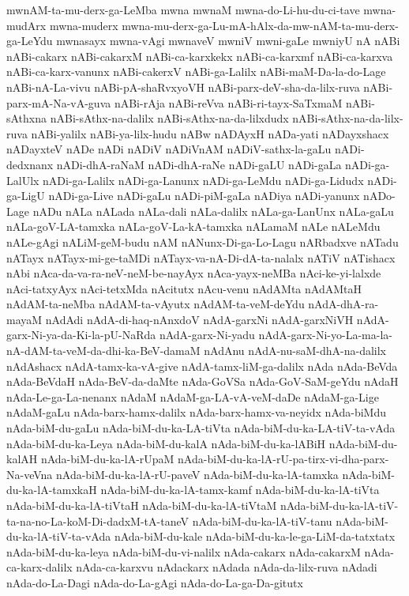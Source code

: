 {mwnAM-ta-mu-derx-ga-LeMba
mwna
mwnaM
mwna-do-Li-hu-du-ci-tave
mwna-mudArx
mwna-muderx
mwna-mu-derx-ga-Lu-mA-hAlx-da-mw-nAM-ta-mu-derx-ga-LeYdu
mwnasayx
mwna-vAgi
mwnaveV
mwniV
mwni-gaLe
mwniyU
nA
nABi
nABi-cakarx
nABi-cakarxM
nABi-ca-karxkekx
nABi-ca-karxmf
nABi-ca-karxva
nABi-ca-karx-vanunx
nABi-cakerxV
nABi-ga-Lalilx
nABi-maM-Da-la-do-Lage
nABi-nA-La-vivu
nABi-pA-shaRvxyoVH
nABi-parx-deV-sha-da-lilx-ruva
nABi-parx-mA-Na-vA-guva
nABi-rAja
nABi-reVva
nABi-ri-tayx-SaTxmaM
nABi-sAthxna
nABi-sAthx-na-dalilx
nABi-sAthx-na-da-lilxdudx
nABi-sAthx-na-da-lilx-ruva
nABi-yalilx
nABi-ya-lilx-hudu
nABw
nADAyxH
nADa-yati
nADayxshacx
nADayxteV
nADe
nADi
nADiV
nADiVnAM
nADiV-sathx-la-gaLu
nADi-dedxnanx
nADi-dhA-raNaM
nADi-dhA-raNe
nADi-gaLU
nADi-gaLa
nADi-ga-LalUlx
nADi-ga-Lalilx
nADi-ga-Lanunx
nADi-ga-LeMdu
nADi-ga-Lidudx
nADi-ga-LigU
nADi-ga-Live
nADi-gaLu
nADi-piM-gaLa
nADiya
nADi-yanunx
nADo-Lage
nADu
nALa
nALada
nALa-dali
nALa-dalilx
nALa-ga-LanUnx
nALa-gaLu
nALa-goV-LA-tamxka
nALa-goV-La-kA-tamxka
nALamaM
nALe
nALeMdu
nALe-gAgi
nALiM-geM-budu
nAM
nANunx-Di-ga-Lo-Lagu
nARbadxve
nATadu
nATayx
nATayx-mi-ge-taMDi
nATayx-va-nA-Di-dA-ta-nalalx
nATiV
nATishacx
nAbi
nAca-da-va-ra-neV-neM-be-nayAyx
nAca-yayx-neMBa
nAci-ke-yi-lalxde
nAci-tatxyAyx
nAci-tetxMda
nAcitutx
nAcu-venu
nAdAMta
nAdAMtaH
nAdAM-ta-neMba
nAdAM-ta-vAyutx
nAdAM-ta-veM-deYdu
nAdA-dhA-ra-mayaM
nAdAdi
nAdA-di-haq-nAnxdoV
nAdA-garxNi
nAdA-garxNiVH
nAdA-garx-Ni-ya-da-Ki-la-pU-NaRda
nAdA-garx-Ni-yadu
nAdA-garx-Ni-yo-La-ma-la-nA-dAM-ta-veM-da-dhi-ka-BeV-damaM
nAdAnu
nAdA-nu-saM-dhA-na-dalilx
nAdAshacx
nAdA-tamx-ka-vA-give
nAdA-tamx-liM-ga-dalilx
nAda
nAda-BeVda
nAda-BeVdaH
nAda-BeV-da-daMte
nAda-GoVSa
nAda-GoV-SaM-geYdu
nAdaH
nAda-Le-ga-La-nenanx
nAdaM
nAdaM-ga-LA-vA-veM-daDe
nAdaM-ga-Lige
nAdaM-gaLu
nAda-barx-hamx-dalilx
nAda-barx-hamx-va-neyidx
nAda-biMdu
nAda-biM-du-gaLu
nAda-biM-du-ka-LA-tiVta
nAda-biM-du-ka-LA-tiV-ta-vAda
nAda-biM-du-ka-Leya
nAda-biM-du-kalA
nAda-biM-du-ka-lABiH
nAda-biM-du-kalAH
nAda-biM-du-ka-lA-rUpaM
nAda-biM-du-ka-lA-rU-pa-tirx-vi-dha-parx-Na-veVna
nAda-biM-du-ka-lA-rU-paveV
nAda-biM-du-ka-lA-tamxka
nAda-biM-du-ka-lA-tamxkaH
nAda-biM-du-ka-lA-tamx-kamf
nAda-biM-du-ka-lA-tiVta
nAda-biM-du-ka-lA-tiVtaH
nAda-biM-du-ka-lA-tiVtaM
nAda-biM-du-ka-lA-tiV-ta-na-no-La-koM-Di-dadxM-tA-taneV
nAda-biM-du-ka-lA-tiV-tanu
nAda-biM-du-ka-lA-tiV-ta-vAda
nAda-biM-du-kale
nAda-biM-du-ka-le-ga-LiM-da-tatxtatx
nAda-biM-du-ka-leya
nAda-biM-du-vi-nalilx
nAda-cakarx
nAda-cakarxM
nAda-ca-karx-dalilx
nAda-ca-karxvu
nAdackarx
nAdada
nAda-da-lilx-ruva
nAdadi
nAda-do-La-Dagi
nAda-do-La-gAgi
nAda-do-La-ga-Da-gitutx
}
